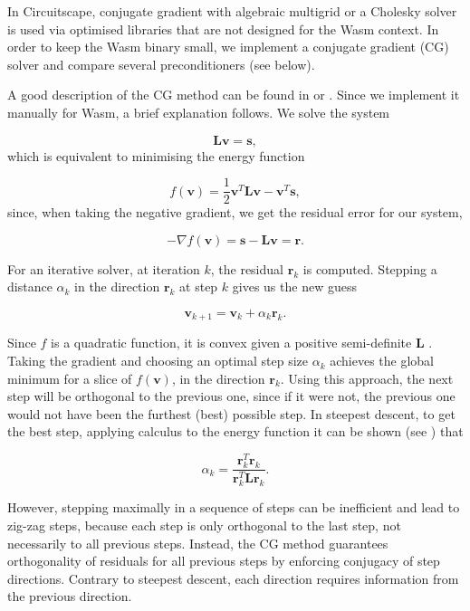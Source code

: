 \documentclass[11pt, a4paper]{article}
\begin{document}
In Circuitscape, conjugate gradient with algebraic multigrid or a Cholesky solver is used via optimised libraries that are not designed for the Wasm context. In order to keep the Wasm binary small, we implement a conjugate gradient (CG) solver and compare several preconditioners (see below).

A good description of the CG method can be found in \cite{shewchuk1994introduction} or \cite[Ch. 4]{leveque2007finite}. Since we implement it manually for Wasm, a brief explanation follows. We solve the system

\[
\mathbf{L}\mathbf{v} = \mathbf{s},
\]
which is equivalent to minimising the energy function

\[
f(\mathbf{v}) = \frac{1}{2} \mathbf{v}^T \mathbf{L}\mathbf{v} - \mathbf{v}^T\mathbf{s},
\]
since, when taking the negative gradient, we get the residual error for our system,

\[
-\nabla f(\mathbf{v}) = \mathbf{s} - \mathbf{L}\mathbf{v} = \mathbf{r}.
\]

For an iterative solver, at iteration $k$, the residual $\mathbf{r}_k$ is computed. Stepping a distance $\alpha_k$ in the direction $\mathbf{r}_k$ at step $k$ gives us the new guess

\[
\mathbf{v}_{k+1} = \mathbf{v}_{k} + \alpha_k \mathbf{r}_k.
\]

Since $f$ is a quadratic function, it is convex given a positive semi-definite $\mathbf{L}$ \cite[Ch. 3.1.4]{vandenberghe2004convex}. Taking the gradient and choosing an optimal step size $\alpha_k$ achieves the global minimum for a slice of $f(\mathbf{v})$, in the direction $\mathbf{r}_k$. Using this approach, the next step will be orthogonal to the previous one, since if it were not, the previous one would not have been the furthest (best) possible step. In steepest descent, to get the best step, applying calculus to the energy function it can be shown (see \cite[Ch. 4]{leveque2007finite}) that

\[
\alpha_{k} = \frac{\mathbf{r}_{k}^T \mathbf{r}_k}{\mathbf{r}_k^T \mathbf{L}\mathbf{r}_k}.
\]

However, stepping maximally in a sequence of steps can be inefficient and lead to zig-zag steps, because each step is only orthogonal to the last step, not
necessarily to all previous steps.
Instead, the CG method guarantees orthogonality of residuals for all previous steps by enforcing conjugacy of step directions.
Contrary to steepest descent, each direction requires information from the previous direction.
\end{document}
